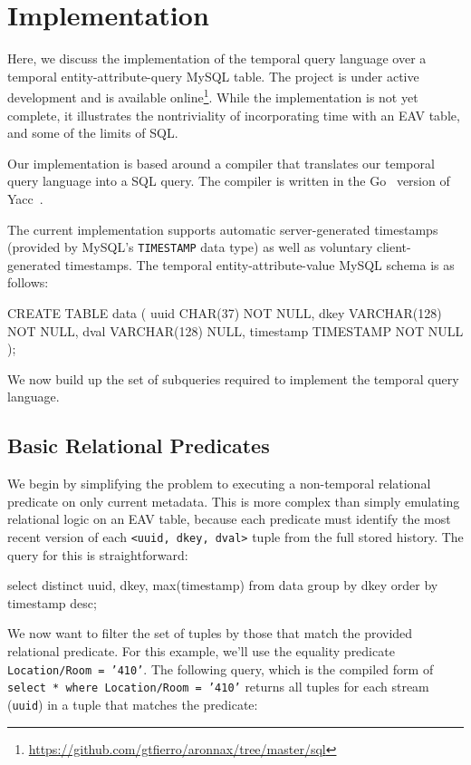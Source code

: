 \section{Implementation} \label{section:implementation}

Here, we discuss the implementation of the temporal query language over a
temporal entity-attribute-query MySQL table. The project is under active
development and is available
online\footnote{\url{https://github.com/gtfierro/aronnax/tree/master/sql}}.
While the implementation is not yet complete, it illustrates the nontriviality
of incorporating time with an EAV table, and some of the limits of SQL.

Our implementation is based around a compiler that translates our temporal
query language into a SQL query. The compiler is written in the Go~\cite{go} version
of Yacc~\cite{johnson1975yacc}\cite{goyacc}.

The current implementation supports automatic server-generated timestamps (provided by MySQL's \texttt{TIMESTAMP}
data type) as well as voluntary client-generated timestamps. The temporal entity-attribute-value MySQL schema is as
follows:
\begin{sqlcode}
CREATE TABLE data
(
    uuid CHAR(37) NOT NULL,
    dkey VARCHAR(128) NOT NULL,
    dval VARCHAR(128) NULL,
    timestamp TIMESTAMP NOT NULL
);
\end{sqlcode}

We now build up the set of subqueries required to implement the temporal query language.

\subsection{Basic Relational Predicates}

We begin by simplifying the problem to executing a non-temporal relational predicate on only current
metadata. This is more complex than simply emulating relational logic on an EAV table, because each
predicate must identify the most recent version of each \texttt{<uuid, dkey, dval>} tuple from the full
stored history. The query for this is straightforward:

\begin{sqlcode}
select distinct uuid, dkey, max(timestamp)
from data
group by dkey order by timestamp desc;
\end{sqlcode}

We now want to filter the set of tuples by those that match the provided relational predicate. For this
example, we'll use the equality predicate \texttt{Location/Room = '410'}. The following query, which is
the compiled form of \texttt{select * where Location/Room = '410'} returns
all tuples for each stream (\texttt{uuid}) in a tuple that matches the predicate:

